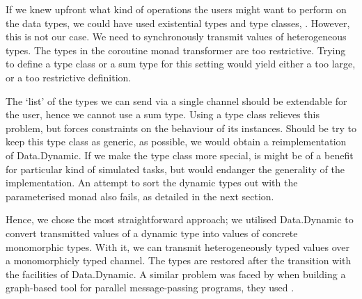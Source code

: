 

If we knew upfront what kind of operations the users might want to perform on the data types, we could have used existential types and type classes, \viz \cite{Laufer:1994:PTI:186025.186031,Kiselyov:2004:STH:1017472.1017488}.
However, this is not our case.
We need to synchronously transmit values of heterogeneous types.
The types in the coroutine monad transformer are too restrictive.
Trying to define a type class or a sum type for this setting would yield either a too large, or a too restrictive definition.

The `list' of the types we can send via a single channel should be extendable for the user, hence we cannot use a sum type.
Using a type class relieves this problem, but forces constraints on the behaviour of its instances.
Should be try to keep this type class as generic, as possible, we would obtain a reimplementation of \textsf{Data.Dynamic}.
If we make the type class more special, is might be of a benefit for particular kind of simulated tasks, but would endanger the generality of the implementation.
An attempt to sort the dynamic types out with the parameterised monad also fails, as detailed in the next section.

%


Hence, we chose the most straightforward approach; we utilised \textsf{Data.Dynamic} to convert transmitted values of a dynamic type into values of concrete monomorphic types.
With it, we can transmit heterogeneously typed values over a monomorphicly typed channel.
The types are restored after the transition with the facilities of \textsf{Data.Dynamic}.
A similar problem was faced by \citeauthor{grace-tfp} when building a graph-based tool for parallel message-passing programs, they used  \cite{grace-tfp}.

